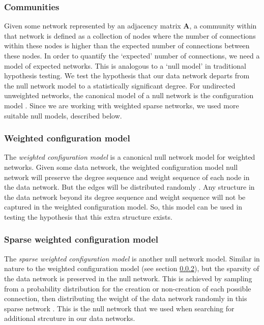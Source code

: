         \subsubsection{Communities}
        Given some network represented by an adjacency matrix $\mathbf{A}$, a community within that network is defined as a collection of nodes where the number of connections within these nodes is higher than the expected number of connections between these nodes. In order to quantify the `expected' number of connections, we need a model of expected networks. This is analogous to a `null model' in traditional hypothesis testing. We test the hypothesis that our data network departs from the null network model to a statistically significant degree. For undirected unweighted networks, the canonical model of a null network is the configuration model  \parencite{fosdick}. Since we are working with weighted sparse networks, we used more suitable null models, described below.

        \subsubsection{Weighted configuration model}\label{sec:weight_configuration_model}
        The \textit{weighted configuration model} is a canonical null network model for weighted networks. Given some data network, the weighted configuration model null network will preserve the degree sequence and weight sequence of each node in the data network. But the edges will be distributed randomly  \parencite{fosdick}. Any structure in the data network beyond its degree sequence and weight sequence will not be captured in the weighted configuration model. So, this model can be used in testing the hypothesis that this extra structure exists.

        \subsubsection{Sparse weighted configuration model}\label{sec:sparse_weighted_configuration_model}
        The \textit{sparse weighted configuration model} is another null network model. Similar in nature to the weighted configuration model (see section \ref{sec:weight_configuration_model}), but the sparsity of the data network is preserved in the null network. This is achieved by sampling from a probability distribution for the creation or non-creation of each possible connection, then distributing the weight of the data network randomly in this sparse network  \parencite{humphries}. This is the null network that we used when searching for additional strcuture in our data networks.

